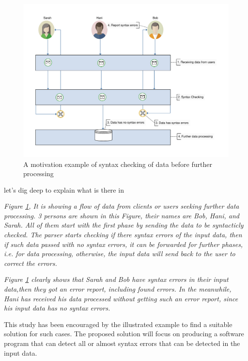 {	\begin{figure}[ht]
		\begin{center}
			\includegraphics[scale=0.5,angle=0]{images/motivation}
			\caption{A motivation example of syntax checking of data before further processing}
			\label{Fig:Motivation}
		\end{center}
	\end{figure}
	\vspace{8mm} %
	
	let's dig deep to explain what is there in  {\it Figure \ref{Fig:Motivation}, It is showing a flow of data from clients or users seeking further data processing. 3 persons are shown in this Figure, their names are Bob, Hani, and Sarah. All of them start with the first phase by sending the data to be syntacticly checked. The parser starts checking if there syntax errors of the input data, then if such data passed with no syntax errors, it can be forwarded for further phases, i.e. for data processing, otherwise, the input data will send back to the user to correct the errors. {\it Figure \ref{Fig:Motivation} clearly shows that Sarah and Bob have syntax errors in their input data,then they got an error report, including found errors. In the meanwhile, Hani has received his data processed without getting such an error report, since his input data has no syntax errors. 
			\vspace{5mm} %
			\par
			This study has been encouraged by the illustrated example to find a suitable solution for such cases. The proposed solution will focus on producing a software program that can detect all or almost syntax errors that can be detected in the input data. 

}}}

